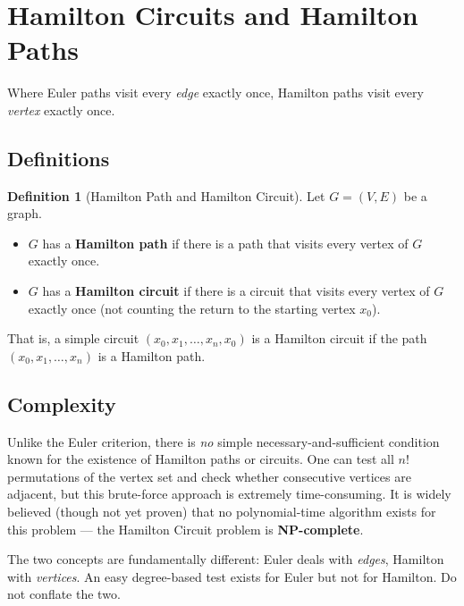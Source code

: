 \documentclass[11pt, a4paper, notitlepage]{report}
\theoremstyle{definition}
\newtheorem{definition}[theorem]{Definition}
\theoremstyle{remark}
\begin{document}
\section{Hamilton Circuits and Hamilton Paths}
\label{sec:hamilton}

Where Euler paths visit every \emph{edge} exactly once, Hamilton paths visit every
\emph{vertex} exactly once.

\subsection{Definitions}
\label{subsec:hamilton-def}

\begin{definition}[Hamilton Path and Hamilton Circuit]
\label{def:hamilton}
Let $G = (V,E)$ be a graph.
\begin{itemize}
  \item $G$ has a \textbf{Hamilton path} if there is a path that visits every vertex of $G$
    exactly once.
  \item $G$ has a \textbf{Hamilton circuit} if there is a circuit that visits every vertex of $G$
    exactly once (not counting the return to the starting vertex $x_0$).
\end{itemize}
That is, a simple circuit $(x_0, x_1, \dots, x_n, x_0)$ is a Hamilton circuit if the path
$(x_0, x_1, \dots, x_n)$ is a Hamilton path.
\end{definition}

\subsection{Complexity}
\label{subsec:hamilton-complexity}

Unlike the Euler criterion, there is \emph{no} simple necessary-and-sufficient condition
known for the existence of Hamilton paths or circuits. One can test all $n!$ permutations of
the vertex set and check whether consecutive vertices are adjacent, but this brute-force
approach is extremely time-consuming. It is widely believed (though not yet proven) that no
polynomial-time algorithm exists for this problem --- the Hamilton Circuit problem is
\textbf{NP-complete}.

\begin{warning}[title={Warning: Euler $\ne$ Hamilton}]
The two concepts are fundamentally different: Euler deals with \emph{edges}, Hamilton with
\emph{vertices}. An easy degree-based test exists for Euler but not for Hamilton. Do not
conflate the two.
\end{warning}
\end{document}
